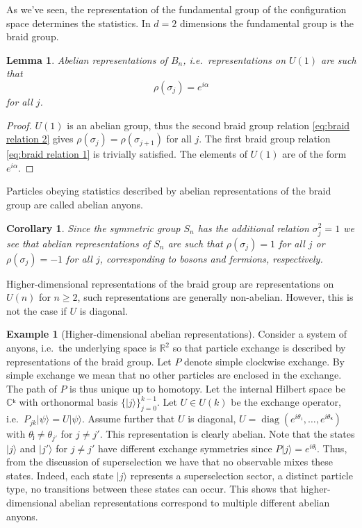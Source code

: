 \documentclass[a4paper,10pt,oneside]{book}
\theoremstyle{plain}
\newtheorem{lemma}[theorem]{Lemma}
\newtheorem{corollary}[theorem]{Corollary}
\theoremstyle{definition}
\newtheorem{example}{Example}[section]
\theoremstyle{remark}
\begin{document}
As we've seen, the representation of the fundamental group of the configuration space determines the statistics. In $d=2$ dimensions the fundamental group is the braid group.

\begin{lemma}
  Abelian representations of $B_n$, i.e.\ representations on $U(1)$ are such that
  \begin{equation}
    ρ(σ_j) = e^{i\alpha}
  \end{equation}
  for all $j$.
\end{lemma}
\begin{proof}
  $U(1)$ is an abelian group, thus the second braid group relation \cref{eq:braid relation 2} gives $ρ(σ_j) = ρ(σ_{j+1})$ for all $j$. The first braid group relation \cref{eq:braid relation 1} is trivially satisfied. The elements of $U(1)$ are of the form $e^{i\alpha}$.
\end{proof}

Particles obeying statistics described by abelian representations of the braid group are called abelian anyons.

\begin{corollary}
  Since the symmetric group $S_n$ has the additional relation $σ_j^2 = 1$ we see that abelian representations of $S_n$ are such that $ρ(σ_j) = 1$ for all $j$ or $ρ(σ_j) = -1$ for all $j$, corresponding to bosons and fermions, respectively.
\end{corollary}

Higher-dimensional representations of the braid group are representations on $U(n)$ for $n \ge 2$, such representations are generally non-abelian. However, this is not the case if $U$ is diagonal.

\begin{example}[Higher-dimensional abelian representations]
  Consider a system of anyons, i.e.\ the underlying space is $\mathbb{R}^2$ so that particle exchange is described by representations of the braid group. Let $P$ denote simple clockwise exchange. By simple exchange we mean that no other particles are enclosed in the exchange. The path of $P$ is thus unique up to homotopy. Let the internal Hilbert space be $\mathbb{C}ᵏ$ with orthonormal basis $\{|j⟩\}_{j=0}^{k-1}$. Let $U \in U(k)$ be the exchange operator, i.e.\ $P_{jk}|ψ⟩ = U|ψ⟩$. Assume further that $U$ is diagonal, $U = \operatorname{diag}(e^{iθ₁}, …, e^{iθₖ})$ with $θⱼ \ne θ_{j'}$ for $j \ne j'$. This representation is clearly abelian. Note that the states $|j⟩$ and $|j'⟩$ for $j \ne j'$ have different exchange symmetries since $P|j⟩ = e^{iθⱼ}$. Thus, from the discussion of superselection we have that no observable mixes these states. Indeed, each state $|j⟩$ represents a superselection sector, a distinct particle type, no transitions between these states can occur. This shows that higher-dimensional abelian representations correspond to multiple different abelian anyons.
\end{example}
\end{document}

